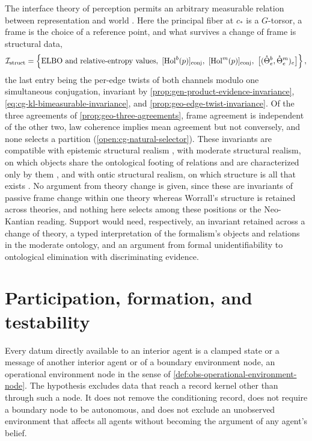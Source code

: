 The interface theory of perception permits an arbitrary measurable relation
between representation and world \citep{Hoffman2015,Hoffman2019}. Here the
principal fiber at \(c_*\) is a \(G\)-torsor, a frame is the choice of a
reference point, and what survives a change of frame is structural data,
\begin{equation}
\mathcal I_{\mathrm{struct}}
=\left\{
\text{ELBO and relative-entropy values},\
[\mathrm{Hol}^b(p)]_{\rm conj},\
[\mathrm{Hol}^m(p)]_{\rm conj},\
\bigl[(\mathring\Theta^b_e,\mathring\Theta^m_e)_{e}\bigr]
\right\},
\label{eq:phil-invariants}
\end{equation}
the last entry being the per-edge twists of both channels modulo one
simultaneous conjugation, invariant by
\cref{prop:gen-product-evidence-invariance},
\eqref{eq:cg-kl-bimeasurable-invariance}, and
\cref{prop:geo-edge-twist-invariance}. Of the three agreements of
\cref{prop:geo-three-agreements}, frame agreement is independent of the other
two, law coherence implies mean agreement but not conversely, and none selects a
partition (\cref{open:cg-natural-selector}). These invariants are compatible
with epistemic structural realism \citep{Worrall1989}, with moderate structural
realism, on which objects share the ontological footing of relations and are
characterized only by them \citep{esfeld2008moderate}, and with ontic structural
realism, on which structure is all that exists \citep{Ladyman2007,Ladyman2014}.
No argument from theory change is given, since these are invariants of passive
frame change within one theory whereas Worrall's structure is retained across
theories, and nothing here selects among these positions or the Neo-Kantian
reading. Support would need, respectively, an invariant retained across
a change of theory, a typed interpretation of the formalism's objects and
relations in the moderate ontology, and an argument from formal
unidentifiability to ontological elimination with discriminating evidence.

\section{Participation, formation, and testability}
\label{sec:phil-participatory}
\label{sec:phil-testable}

Every datum directly available to an interior agent is a clamped state or a
message of another interior agent or of a boundary environment node, an
operational environment node in the sense of
\cref{def:obs-operational-environment-node}. The hypothesis excludes data that
reach a record kernel other than through such a node. It does not remove the
conditioning record, does not require a boundary node to be autonomous, and does
not exclude an unobserved environment that affects all agents without becoming
the argument of any agent's belief.

